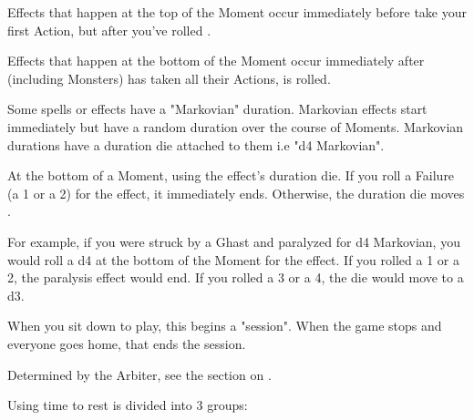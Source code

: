 {\begin{multicols*}{2}

Effects that happen at the top of the Moment occur immediately before  take your first Action, but after you've rolled .

Effects that happen at the bottom of the Moment occur immediately after  (including Monsters) has taken all their Actions,   is rolled.



Some spells or effects have a "Markovian" duration.  Markovian effects start immediately but have a random duration over the course of Moments. Markovian durations have a duration die attached to them i.e "d4 Markovian".

At the bottom of a Moment, \RS using the effect's duration die.  If you roll a Failure (a 1 or a 2) for the effect, it immediately ends.  Otherwise, the duration die moves \DCDOWN. 

For example, if you were struck by a Ghast and paralyzed for d4 Markovian, you would roll a d4 at the bottom of the Moment for the effect.  If you rolled a 1 or a 2, the paralysis effect would end.  If you rolled a 3 or a 4, the die would move to a d3.


When you sit down to play, this begins a "session".  When the game stops and everyone goes home, that ends the session.  

\cbreak\bump


Determined by the Arbiter, see the section on .


Using time to rest is divided into 3 groups:





\end{multicols*}}
